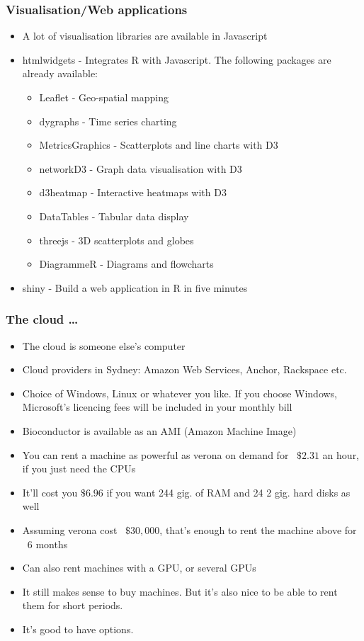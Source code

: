 \documentclass{beamer}
\begin{document}
\begin{frame}
\frametitle{Visualisation/Web applications}
\begin{itemize}
\item A lot of visualisation libraries are available in Javascript
\item htmlwidgets - Integrates R with Javascript. The following packages are already
			available:
			\begin{itemize}
			\item Leaflet - Geo-spatial mapping
			\item dygraphs - Time series charting
			\item MetricsGraphics - Scatterplots and line charts with D3
			\item networkD3 - Graph data visualisation with D3
			\item d3heatmap - Interactive heatmaps with D3
			\item DataTables - Tabular data display
			\item threejs - 3D scatterplots and globes
			\item DiagrammeR - Diagrams and flowcharts
			\end{itemize}
\item shiny - Build a web application in R in five minutes
\end{itemize}
\end{frame}

\begin{frame}
\frametitle{The cloud \ldots}
\begin{itemize}
\item The cloud is someone else's computer
\item Cloud providers in Sydney: Amazon Web Services, Anchor, Rackspace etc.
\item Choice of Windows, Linux or whatever you like. If you choose Windows, Microsoft's 
			licencing fees will be included in your monthly bill
\item Bioconductor is available as an AMI (Amazon Machine Image)
\item You can rent a machine as powerful as verona on demand for ~$\$2.31$ an hour, if you 
			just need the CPUs
\item It'll cost you $\$6.96$ if you want 244 gig. of RAM and 24 2 gig. hard disks as well
\item Assuming verona cost ~$\$30,000$, that's enough to rent the machine above for ~6 months
\item Can also rent machines with a GPU, or several GPUs
\item It still makes sense to buy machines. But it's also nice to be able to rent them for
			short periods.
\item It's good to have options.
\end{itemize}
\end{frame}
\end{document}
